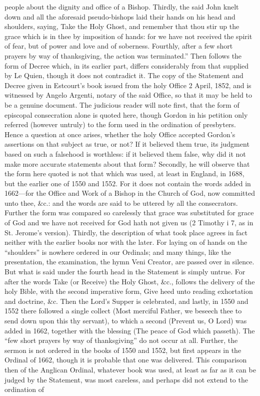 people about the dignity and office of a Bishop. Thirdly, the said John knelt down and all the aforesaid pseudo-bishops laid their hands on his head and shoulders, saying, Take the Holy Ghost, and remember that thou stir up the grace which is in thee by imposition of hands: for we have not received the spirit of fear, but of power and love and of soberness. Fourthly, after a few short prayers by way of thanksgiving, the action was terminated.” Then follows the form of Decree which, in its earlier part, differs considerably from that supplied by Le Quien, though it does not contradict it. The copy of the Statement and Decree given in Estcourt’s book issued from the holy Office 2 April, 1852, and is witnessed by Angelo Argenti, notary of the said Office, so that it may be held to be a genuine document. The judicious reader will note first, that the form of episcopal consecration alone is quoted here, though Gordon in his petition only referred (however untruly) to the form used in the ordination of presbyters. Hence a question at once arises, whether the holy Office accepted Gordon’s assertions on that subject as true, or not? If it believed them true, its judgment based on such a falsehood is worthless: if it believed them false, why did it not make more accurate statements about that form? Secondly, he will observe that the form here quoted is not that which was used, at least in England, in 1688, but the earlier one of 1550 and 1552. For it does not contain the words added in 1662—for the Office and Work of a Bishop in the Church of God, now committed unto thee, \&c.: and the words are said to be uttered by all the consecrators. Further the form was compared so carelessly that grace was substituted for grace of God and we have not received for God hath not given us (2 Timothy i 7, as in St. Jerome’s version). Thirdly, the description of what took place agrees in fact neither with the earlier books nor with the later. For laying on of hands on the “shoulders” is nowhere ordered in our Ordinals; and many things, like the presentation, the examination, the hymn Veni Creator, are passed over in silence. But what is said under the fourth head in the Statement is simply untrue. For after the words Take (or Receive) the Holy Ghost, \&c., follows the delivery of the holy Bible, with the second imperative form, Give heed unto reading exhortation and doctrine, \&c. Then the Lord’s Supper is celebrated, and lastly, in 1550 and 1552 there followed a single collect (Most merciful Father, we beseech thee to send down upon this thy servant), to which a second (Prevent us, O Lord) was added in 1662, together with the blessing (The peace of God which passeth). The “few short prayers by way of thanksgiving” do not occur at all. Further, the sermon is not ordered in the books of 1550 and 1552, but first appears in the Ordinal of 1662, though it is probable that one was delivered. This comparison then of the Anglican Ordinal, whatever book was used, at least as far as it can be judged by the Statement, was most careless, and perhaps did not extend to the ordination of

